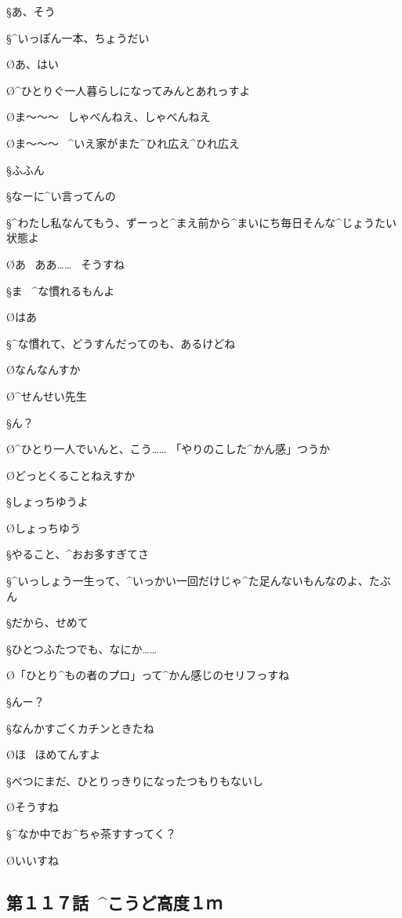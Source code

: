 \S あ、そう

\S ^{いっぽん}{一本}、ちょうだい

\O あ、はい

\page
\O ^{ひとりぐ}{一人暮}らしになってみんとあれっすよ

\O ま〜〜〜
\ しゃべんねえ、しゃべんねえ

\page
\O ま〜〜〜
\ ^{いえ}{家}がまた^{ひれ}{広}え^{ひれ}{広}え

\S ふふん

\S なーに^{い}{言}ってんの

\S ^{わたし}{私}なんてもう、ずーっと^{まえ}{前}から^{まいにち}{毎日}そんな^{じょうたい}{状態}よ

\O あ
\ ああ……
\ そうすね

\page
\S ま
\ ^{な}{慣}れるもんよ

\O はあ

\S ^{な}{慣}れて、どうすんだってのも、あるけどね

\O なんなんすか

\page[85]
\O ^{せんせい}{先生}

\S ん？

\O ^{ひとり}{一人}でいんと、こう……
「やりのこした^{かん}{感}」つうか

\O どっとくることねえすか

\S しょっちゆうよ

\O しょっちゆう

\page
\S やること、^{おお}{多}すぎてさ

\S ^{いっしょう}{一生}って、^{いっかい}{一回}だけじゃ^{た}{足}んないもんなのよ、たぶん

\S だから、せめて

\S ひとつふたつでも、なにか……

\page
\O 「ひとり^{もの}{者}のプロ」って^{かん}{感}じのセリフっすね

\S んー？

\S なんかすごくカチンときたね

\O ほ
\ ほめてんすよ

\page
\S べつにまだ、ひとりっきりになったつもりもないし

\O そうすね

\S ^{なか}{中}でお^{ちゃ}{茶}すすってく？

\O いいすね


\subsection{第１１７話\ ^{こうど}{高度}１ｍ}

